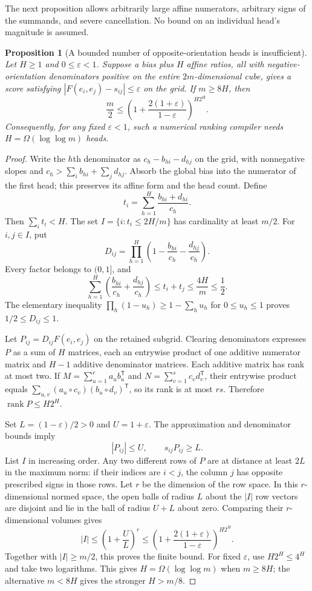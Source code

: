 \documentclass[11pt]{article}
\newtheorem{proposition}{Proposition}
\begin{document}
The next proposition allows arbitrarily large affine numerators,
arbitrary signs of the summands, and severe cancellation. No bound
on an individual head's magnitude is assumed.

\begin{proposition}[A bounded number of opposite-orientation heads is insufficient]
Let $H\geq1$ and $0\leq\varepsilon<1$. Suppose a bias plus $H$
affine ratios, all with negative-orientation denominators positive
on the entire $2m$-dimensional cube, gives a score satisfying
$|F(e_i,e_j)-s_{ij}|\leq\varepsilon$ on the grid. If $m\geq8H$,
then
\[
 \frac m2\leq
 \left(1+\frac{2(1+\varepsilon)}{1-\varepsilon}\right)^{H2^H}.
\]
Consequently, for any fixed $\varepsilon<1$, such a numerical
ranking compiler needs $H=\Omega(\log\log m)$ heads.
\end{proposition}
\begin{proof}
Write the $h$th denominator as
$c_h-b_{hi}-d_{hj}$ on the grid, with nonnegative slopes and
$c_h>\sum_i b_{hi}+\sum_jd_{hj}$.
Absorb the global bias into the numerator of the first head;
this preserves its affine form and the head count. Define
\[
 t_i=\sum_{h=1}^H\frac{b_{hi}+d_{hi}}{c_h}.
\]
Then $\sum_i t_i<H$. The set
$I=\{i:t_i\leq2H/m\}$ has cardinality at least $m/2$.
For $i,j\in I$, put
\[
 D_{ij}=\prod_{h=1}^H
 \left(1-\frac{b_{hi}}{c_h}-\frac{d_{hj}}{c_h}\right).
\]
Every factor belongs to $(0,1]$, and
\[
 \sum_{h=1}^H\left(\frac{b_{hi}}{c_h}+\frac{d_{hj}}{c_h}\right)
 \leq t_i+t_j\leq\frac{4H}{m}\leq\frac12.
\]
The elementary inequality $\prod_h(1-u_h)\geq1-\sum_hu_h$
for $0\leq u_h\leq1$ proves $1/2\leq D_{ij}\leq1$.

Let $P_{ij}=D_{ij}F(e_i,e_j)$ on the retained subgrid. Clearing
denominators expresses $P$ as a sum of $H$ matrices, each an
entrywise product of one additive numerator matrix and $H-1$
additive denominator matrices. Each additive matrix has rank at
most two. If $M=\sum_{u=1}^r a_u b_u^{\mathsf T}$ and
$N=\sum_{v=1}^s c_vd_v^{\mathsf T}$, their entrywise product
equals $\sum_{u,v}(a_u\circ c_v)(b_u\circ d_v)^{\mathsf T}$,
so its rank is at most $rs$. Therefore
$\operatorname{rank}P\leq H2^H$.

Set $L=(1-\varepsilon)/2>0$ and $U=1+\varepsilon$.
The approximation and denominator bounds imply
\[
 |P_{ij}|\leq U,\qquad s_{ij}P_{ij}\geq L.
\]
List $I$ in increasing order. Any two different rows of $P$ are
at distance at least $2L$ in the maximum norm: if their indices
are $i<j$, the column $j$ has opposite prescribed signs in those
rows. Let $r$ be the dimension of the row space. In this
$r$-dimensional normed space, the open balls of radius $L$ about
the $|I|$ row vectors are disjoint and lie in the ball of radius
$U+L$ about zero. Comparing their $r$-dimensional volumes gives
\[
 |I|\leq\left(1+\frac UL\right)^r
 \leq\left(1+\frac{2(1+\varepsilon)}{1-\varepsilon}\right)^{H2^H}.
\]
Together with $|I|\geq m/2$, this proves the finite bound.
For fixed $\varepsilon$, use $H2^H\leq4^H$ and take two
logarithms. This gives $H=\Omega(\log\log m)$ when $m\geq8H$;
the alternative $m<8H$ gives the stronger $H>m/8$.
\end{proof}
\end{document}
